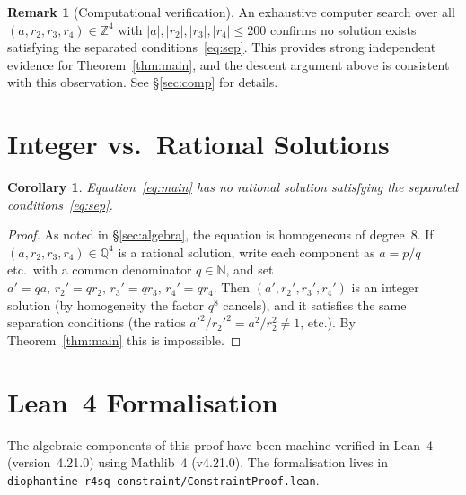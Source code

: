 \documentclass[12pt, a4paper]{article}
\newtheorem{corollary}[theorem]{Corollary}
\theoremstyle{definition}
\newtheorem{remark}[theorem]{Remark}
\newcommand{\Z}{\mathbb{Z}}
\newcommand{\Q}{\mathbb{Q}}
\newcommand{\N}{\mathbb{N}}
\begin{document}
\begin{remark}[Computational verification]\label{rem:comp}
  An exhaustive computer search over all $(a, r_2, r_3, r_4) \in \Z^4$ with
  $|a|,|r_2|,|r_3|,|r_4| \leq 200$ confirms no solution exists satisfying the
  separated conditions~\eqref{eq:sep}.  This provides strong independent
  evidence for Theorem~\ref{thm:main}, and the descent argument above is
  consistent with this observation.  See \S\ref{sec:comp} for details.
\end{remark}

\section{Integer vs.\ Rational Solutions}\label{sec:rational}

\begin{corollary}
  Equation~\eqref{eq:main} has no rational solution satisfying the separated
  conditions~\eqref{eq:sep}.
\end{corollary}

\begin{proof}
  As noted in \S\ref{sec:algebra}, the equation is homogeneous of degree~$8$.
  If $(a,r_2,r_3,r_4) \in \Q^4$ is a rational solution, write each component
  as $a = p/q$ etc.\ with a common denominator $q \in \N$, and set
  $a' = qa,\, r_2' = qr_2,\, r_3' = qr_3,\, r_4' = qr_4$.  Then
  $(a', r_2', r_3', r_4')$ is an integer solution (by homogeneity the factor
  $q^8$ cancels), and it satisfies the same separation conditions (the ratios
  $a'^2/r_2'^2 = a^2/r_2^2 \neq 1$, etc.).  By Theorem~\ref{thm:main} this is
  impossible.
\end{proof}

\section{Lean~4 Formalisation}\label{sec:lean}

The algebraic components of this proof have been machine-verified in Lean~4
(version~4.21.0) using Mathlib~4 (v4.21.0).  The formalisation lives in
\texttt{diophantine-r4sq-constraint/ConstraintProof.lean}.
\end{document}
